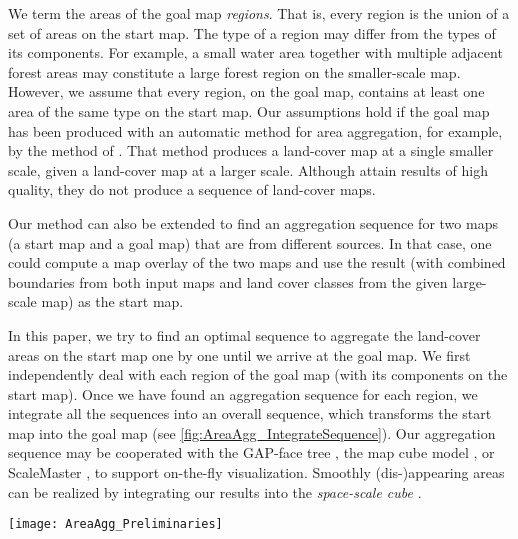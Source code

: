 \documentclass[acmsmall,natbib=false]{acmart}
\begin{document}
We term the areas of the goal map \emph{regions}.
That is, every region is the union of a set of areas 
on the start map.
The type of a region may differ from the types of its components. 
For example, a small water area together with 
multiple adjacent forest areas may constitute 
a large forest region on the smaller-scale map.
However, we assume that every region, on the goal map, 
contains at least one area of the same type on the start map.
Our assumptions hold if the goal map has been produced 
with an automatic method for area aggregation, 
for example, by the method of \citet{HaunertWolff2010AreaAgg}.
That method produces a land-cover map at a single smaller scale, 
given a land-cover map at a larger scale.
Although \textcite{HaunertWolff2010AreaAgg}
attain results of high quality, 
they do not produce a sequence of land-cover maps.

Our method can also be extended to find an aggregation sequence 
for two maps (a start map and a goal map) that are from different sources.
In that case, one could compute a map overlay of the two maps
and use the result 
(with combined boundaries from both input maps and land cover classes 
from the given large-scale map) 
as the start map.

In this paper, we try to find an optimal sequence
to aggregate the land-cover areas on the start map
one by one until we arrive at the goal map.
We first independently deal with each region of the goal map 
(with its components on the start map).
Once we have found an aggregation sequence for each region, 
we integrate all the sequences into an overall sequence,
which transforms the start map into the goal map
(see \fig\ref{fig:AreaAgg_IntegrateSequence}). 
Our aggregation sequence may be cooperated with
the GAP-face tree \citep{vanOosterom2005},
the map cube model \citep{Timpf1998},
or ScaleMaster \citep{Brewer2007Guidelines,Touya2013ScaleMaster}, 
to support on-the-fly visualization.
Smoothly (dis-)appearing areas can be realized
by integrating our results into the \emph{space-scale cube}
\parencite{vanOosterom2014Support,vanOosterom2014tGAPSSC}.

\begin{figure*}[tb]
\centering
\texttt{[image: AreaAgg\_Preliminaries]}
\caption{Integrating two aggregation sequences 
	of different regions: 
	the resulting sequence contains the given sequences 
	as subsequences and 
	always takes the subdivision with smallest patch next.
	The gray arrows show the integration of the two regions.
}
\label{fig:AreaAgg_IntegrateSequence}
\end{figure*}
\end{document}
